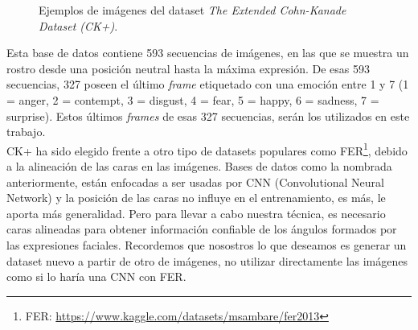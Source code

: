 \begin{figure}[h!]
  \begin{center}
    \subcapcentertrue
  \end{center}
\captionsetup{justification=centering}
\caption{Ejemplos de imágenes del dataset \textit{The Extended Cohn-Kanade Dataset (CK+)}.}
\label{fig:ejemplosCK}
\end{figure}

Esta base de datos contiene 593 secuencias de imágenes, en las que se muestra un rostro desde una posición neutral hasta la máxima expresión. De esas 593 secuencias, 327 poseen el último \textit{frame} etiquetado con una emoción entre 1 y 7 (1 = anger, 2 = contempt, 3 = disgust, 4 = fear, 5 = happy, 6 = sadness, 7 = surprise). Estos últimos \textit{frames} de esas 327 secuencias, serán los utilizados en este trabajo.\\

CK+ ha sido elegido frente a otro tipo de datasets populares como FER\footnote{FER: \url{https://www.kaggle.com/datasets/msambare/fer2013}}, debido a la alineación de las caras en las imágenes. Bases de datos como la nombrada anteriormente, están enfocadas a ser usadas por CNN (Convolutional Neural Network) y la posición de las caras no influye en el entrenamiento, es más, le aporta más generalidad. Pero para llevar a cabo nuestra técnica, es necesario caras alineadas para obtener información confiable de los ángulos formados por las expresiones faciales. Recordemos que nosostros lo que deseamos es generar un dataset nuevo a partir de otro de imágenes, no utilizar directamente las imágenes como si lo haría una CNN con FER.

